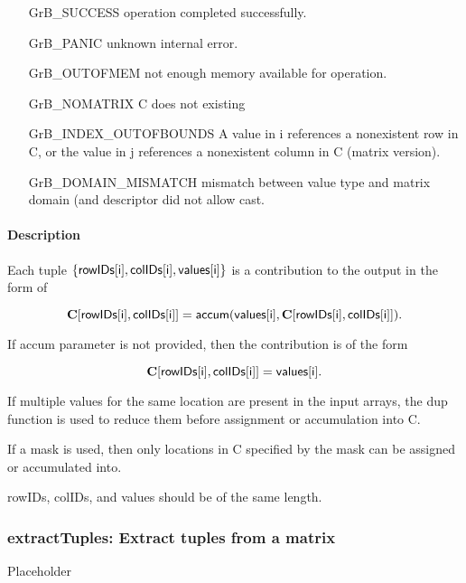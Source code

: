 \begin{itemize}[leftmargin=2.1in]
\item[{\sf GrB\_SUCCESS}] 	operation completed successfully.
\item[{\sf GrB\_PANIC}]	    unknown internal error.
\item[{\sf GrB\_OUTOFMEM}]	not enough memory available for operation.
\item[{\sf GrB\_NOMATRIX}]  C does not existing
\item[{\sf GrB\_INDEX\_OUTOFBOUNDS}]
        A value in i references a nonexistent row in C, or
	    the value in j references a nonexistent column in C (matrix version).
\item[\sf GrB\_DOMAIN\_MISMATCH]  
	   mismatch between value type and matrix domain (and descriptor did not allow cast.
\end{itemize}


\paragraph{Description}
Each tuple $\{ {\sf rowIDs[i]}, {\sf colIDs[i]}, {\sf values[i]}\}$ is a contribution to the output in the form of 

$${\bf C}[{\sf rowIDs[i]},{\sf colIDs[i]}] = {\sf accum}({\sf values[i]}, {\bf C}[{\sf rowIDs[i]}, {\sf colIDs[i]}]).$$

If {\sf accum} parameter is not provided, then the contribution is of the form 

$${\bf C}[{\sf rowIDs[i]}, {\sf colIDs[i]}] = {\sf values[i]}.$$

If multiple values for the same location are present in the input arrays, the 
dup function is used to reduce them before assignment or accumulation into {\sf C}.

If a mask is used, then only locations in {\sf C} specified by the mask can be assigned or
accumulated into.
 
{\sf rowIDs}, {\sf colIDs}, and {\sf values} should be of the same length. 


\subsubsection{{\sf extractTuples}: Extract tuples from a matrix}
\label{Sec:extractTuples}

Placeholder

